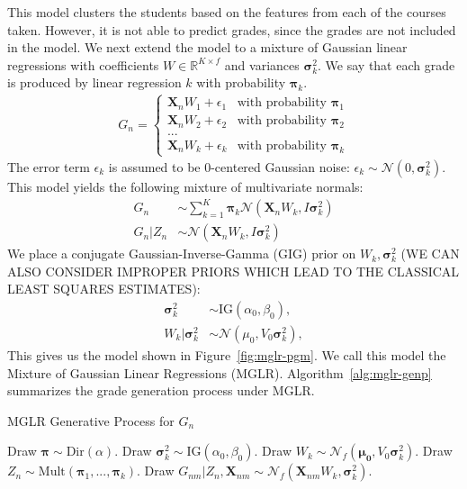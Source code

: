 \documentclass[10pt]{proc}
\begin{document}
This model clusters the students based on the features from each of the courses
taken. However, it is not able to predict grades, since the grades are not
included in the model. We next extend the model to a mixture of Gaussian linear
regressions with coefficients $W \in \mathbb{R}^{K \times f}$ and
variances $\bm{\sigma}_k^2$. We say that each grade is produced by linear
regression $k$ with probability $\bm{\pi}_k$.
%
\begin{align}
    G_n =
    \begin{cases}
        \bm{X}_n W_1 + \epsilon_1  &  \text{with probability } \bm{\pi}_1  \\
        \bm{X}_n W_2 + \epsilon_2  &  \text{with probability } \bm{\pi}_2  \\
        ...                        &                                       \\
        \bm{X}_n W_k + \epsilon_k  &  \text{with probability } \bm{\pi}_k
    \end{cases}
\end{align}
%
The error term $\epsilon_k$ is assumed to be 0-centered Gaussian noise:
$\epsilon_k \sim \mathcal{N}(0, \bm{\sigma}_k^2)$. This model yields the following
mixture of multivariate normals:
%
\begin{align}
    G_n &\sim
        \sum_{k=1}^K \bm{\pi}_k
            \mathcal{N}(\bm{X}_n W_k, I \bm{\sigma}_k^2)  \\
    G_n | Z_n &\sim
        \mathcal{N}(\bm{X}_n W_k, I \bm{\sigma}_k^2)
\end{align}
%
We place a conjugate Gaussian-Inverse-Gamma (GIG) prior on $W_k,
\bm{\sigma}_k^2$ (WE CAN ALSO CONSIDER IMPROPER PRIORS WHICH LEAD TO THE
CLASSICAL LEAST SQUARES ESTIMATES):
%
\begin{align}
    \bm{\sigma}_k^2 &\sim \text{IG}(\alpha_0, \beta_0),  \\
    W_k | \bm{\sigma}_k^2 &\sim
        \mathcal{N}(\mu_0, V_0 \bm{\sigma}_k^2),
\end{align}
%
This gives us the model shown in Figure~\ref{fig:mglr-pgm}. We call this model
the Mixture of Gaussian Linear Regressions (MGLR).
Algorithm~\ref{alg:mglr-genp} summarizes the grade generation process under
MGLR.
%
\begin{algorithm}
    \caption{MGLR Generative Process for $G_n$}
    \label{alg:mglr-genp}
    \begin{algorithmic}[1]
        \item  Draw $\bm{\pi} \sim \text{Dir}(\alpha)$.
            \State  Draw $\bm{\sigma}_k^2 \sim \text{IG}(\alpha_0, \beta_0)$.
            \State  Draw $W_k \sim
                \mathcal{N}_f(\bm{\mu_0}, V_0 \bm{\sigma}_k^2)$.
        \EndFor
            \State  Draw $Z_n \sim \text{Mult}(\bm{\pi}_1, ..., \bm{\pi}_k)$.
                \State  Draw $G_{nm} | Z_n, \bm{X}_{nm} \sim
                    \mathcal{N}_f(\bm{X}_{nm} W_k, \bm{\sigma}_k^2)$.
            \EndFor
        \EndFor
    \end{algorithmic}
\end{algorithm}
\end{document}
